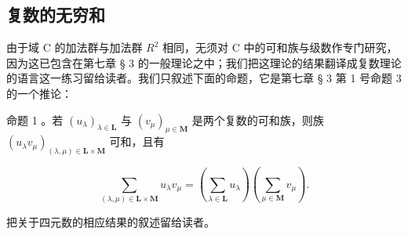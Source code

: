 \subsection{复数的无穷和}

由于域 C 的加法群与加法群 \(R^{2}\) 相同，无须对 C 中的可和族与级数作专门研究，因为这已包含在第七章 § 3 的一般理论之中；我们把这理论的结果翻译成复数理论的语言这一练习留给读者。我们只叙述下面的命题，它是第七章 § 3 第 1 号命题 3 的一个推论：

命题 1 。若 \((u_{\lambda})_{\lambda \in \mathbf{L}}\) 与 \((v_{\mu})_{\mu \in \mathbf{M}}\) 是两个复数的可和族，则族 \((u_{\lambda}v_{\mu})_{(\lambda ,\mu)\in \mathbf{L}\times \mathbf{M}}\) 可和，且有

\[
\sum_ {(\lambda , \mu) \in \mathbf {L} \times \mathbf {M}} u _ {\lambda} v _ {\mu} = \left(\sum_ {\lambda \in \mathbf {L}} u _ {\lambda}\right) \left(\sum_ {\mu \in \mathbf {M}} v _ {\mu}\right).\tag{1}
\]

把关于四元数的相应结果的叙述留给读者。

